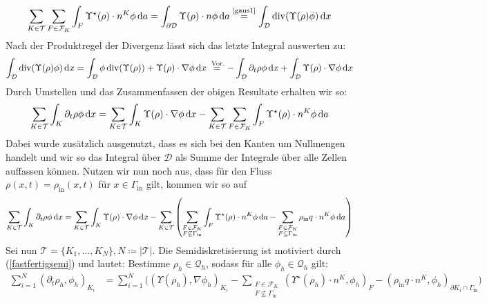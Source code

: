 \begin{align*}
	\sum_{K\in \mathcal{T}} \sum_{F \in \mathcal{F}_K} \int_F \Upsilon^{\star}(\rho) \cdot n^K \phi \, \mathrm{d} a = \int_{\partial \mathcal{D}} \Upsilon(\rho) \cdot n \phi \, \mathrm{d} a \stackrel{\text{\ref{gaus1}}}{=} \int_{\mathcal{D}} \operatorname{div} (\Upsilon(\rho)\phi) \, \mathrm{d} x
\end{align*}
Nach der Produktregel der Divergenz lässt sich das letzte Integral auswerten zu:
\begin{align*}
	 \int_{\mathcal{D}} \operatorname{div} (\Upsilon(\rho)\phi) \, \mathrm{d} x = \int_{\mathcal{D}} \phi \operatorname{div}(\Upsilon(\rho)) + \Upsilon(\rho) \cdot \nabla \phi \, \mathrm{d} x \stackrel{\text{ Vor.}}{=} - \int_{\mathcal{D}} \partial_t \rho \phi \, \mathrm{d} x + \int_{\mathcal{D}} \Upsilon(\rho) \cdot \nabla \phi \, \mathrm{d} x
\end{align*}
Durch Umstellen und das Zusammenfassen der obigen Resultate erhalten wir so: 
\begin{align*}
	\sum_{K \in \mathcal{T}} \int_K \partial_t \rho  \phi \, \mathrm{d} x = \sum_{K \in \mathcal{T}} \int_K \Upsilon(\rho ) \cdot \nabla \phi \, \mathrm{d} x - 	\sum_{K\in \mathcal{T}} \sum_{F \in \mathcal{F}_K} \int_F \Upsilon^{\star}(\rho) \cdot n^K \phi \, \mathrm{d} a
\end{align*}
Dabei wurde zusätzlich ausgenutzt, dass es sich bei den Kanten um Nullmengen handelt und wir so das Integral über $ \mathcal{D} $ als Summe der Integrale über alle Zellen auffassen können. Nutzen wir nun noch aus, dass für den Fluss  $\rho(x,t) = \rho_{\text{in}}(x,t)$ für $ x \in \Gamma_{\text{in}} $ gilt, kommen wir so auf 
\begin{align}
	\label{fastfertigsemi}
	\sum_{K \in \mathcal{T}} \int_K \partial_t \rho  \phi \, \mathrm{d} x = \sum_{K \in \mathcal{T}} \int_K \Upsilon(\rho ) \cdot \nabla \phi \, \mathrm{d} x - 	\sum_{K\in \mathcal{T}} \left( \sum_{\substack{F \in \mathcal{F}_K \\ F \not\subseteq \Gamma_{\text{in}}}} \int_F \Upsilon^{\star}(\rho) \cdot n^K \phi \, \mathrm{d} a - \sum_{\substack{F \in \mathcal{F}_K \\ F \subseteq \Gamma_{\text{in}}}} \rho_{\text{in}} q \cdot n^K \phi \, \mathrm{d} a \right)
\end{align}
Sei nun $ \mathcal{T} = \{ K_1,\dots , K_N\} , N \coloneqq |\mathcal{T}| $. Die Semidiskretisierung ist motiviert durch (\ref{fastfertigsemi}) und lautet: Bestimme  $\rho_h \in \mathcal{Q}_h$, sodass für alle $ \phi_h \in \mathcal{Q}_h $ gilt:
\begin{align}
	\label{Semidiskretisierung}
	\sum_{i=1}^N (\partial_t \rho_h, \phi_h)_{K_i} &= \sum_{i=1}^{N} \big( (\Upsilon(\rho_h), \nabla \phi_h)_{K_i} - \sum_{\substack{F \in \mathcal{F}_K \\ F \not \subseteq \Gamma_{\text{in}}}}(\Upsilon^{\star}(\rho_h)\cdot n^K,\phi_h)_{F} - (\rho_{\text{in}}q \cdot n^K,\phi_h)_{\partial K_i \cap \Gamma_{\text{in}}} \big)
\end{align}


